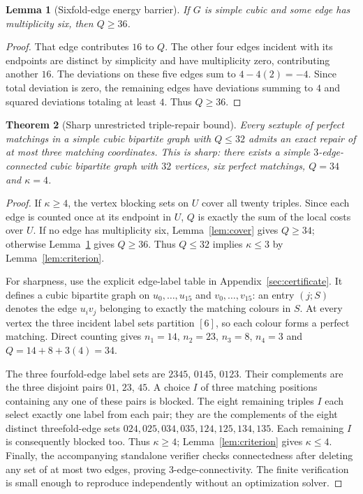 \documentclass[11pt]{article}
\newtheorem{theorem}{Theorem}
\newtheorem{lemma}[theorem]{Lemma}
\newcommand{\kk}{\kappa}
\begin{document}
\begin{lemma}[Sixfold-edge energy barrier]\label{lem:six}
If $G$ is simple cubic and some edge has multiplicity six, then $Q\ge36$.
\end{lemma}
\begin{proof}
That edge contributes $16$ to $Q$. The other four edges incident with its endpoints are distinct by simplicity and have multiplicity zero, contributing another $16$. The deviations on these five edges sum to $4-4(2)=-4$. Since total deviation is zero, the remaining edges have deviations summing to $4$ and squared deviations totaling at least $4$. Thus $Q\ge36$.
\end{proof}

\begin{theorem}[Sharp unrestricted triple-repair bound]\label{thm:triple}
Every sextuple of perfect matchings in a simple cubic bipartite graph with $Q\le32$ admits an exact repair of at most three matching coordinates. This is sharp: there exists a simple $3$-edge-connected cubic bipartite graph with $32$ vertices, six perfect matchings, $Q=34$ and $\kk=4$.
\end{theorem}
\begin{proof}
If $\kk\ge4$, the vertex blocking sets on $U$ cover all twenty triples. Since each edge is counted once at its endpoint in $U$, $Q$ is exactly the sum of the local costs over $U$. If no edge has multiplicity six, Lemma~\ref{lem:cover} gives $Q\ge34$; otherwise Lemma~\ref{lem:six} gives $Q\ge36$. Thus $Q\le32$ implies $\kk\le3$ by Lemma~\ref{lem:criterion}.

For sharpness, use the explicit edge-label table in Appendix~\ref{sec:certificate}. It defines a cubic bipartite graph on $u_0,\ldots,u_{15}$ and $v_0,\ldots,v_{15}$: an entry $(j;S)$ denotes the edge $u_iv_j$ belonging to exactly the matching colours in $S$. At every vertex the three incident label sets partition $[6]$, so each colour forms a perfect matching. Direct counting gives $n_1=14$, $n_2=23$, $n_3=8$, $n_4=3$ and $Q=14+8+3(4)=34$.

The three fourfold-edge label sets are $2345$, $0145$, $0123$. Their complements are the three disjoint pairs $01$, $23$, $45$. A choice $I$ of three matching positions containing any one of these pairs is blocked. The eight remaining triples $I$ each select exactly one label from each pair; they are the complements of the eight distinct threefold-edge sets $024,025,034,035,124,125,134,135$. Each remaining $I$ is consequently blocked too. Thus $\kk\ge4$; Lemma~\ref{lem:criterion} gives $\kk\le4$. Finally, the accompanying standalone verifier checks connectedness after deleting any set of at most two edges, proving $3$-edge-connectivity. The finite verification is small enough to reproduce independently without an optimization solver.
\end{proof}
\end{document}
